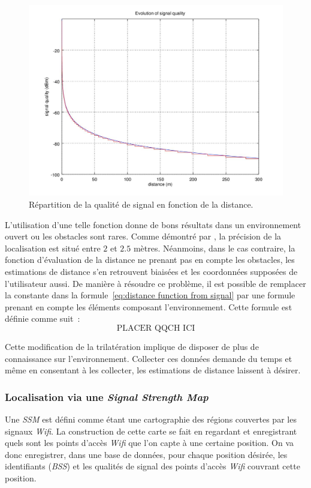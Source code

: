 \documentclass[11pt,journal,compsoc]{IEEEtran}
\begin{document}
      \begin{figure}
        \includegraphics[scale=0.4]{images/signal-propagation.jpg}
        \caption{Répartition de la qualité de signal en fonction de la distance.}
      \end{figure}

	  L'utilisation d'une telle fonction donne de bons résultats dans un environnement ouvert ou les obstacles sont rares. Comme démontré par \cite{Roumanie},
	  la précision de la localisation est situé entre $2$ et $2.5$ mètres. Néanmoins, dans le cas contraire, la fonction d'évaluation de la distance ne prenant
	  pas en compte les obstacles, les estimations de distance s'en retrouvent biaisées et les coordonnées supposées de l'utilisateur aussi. De manière à résoudre
	  ce problème, il est possible de remplacer la constante dans la formule~\eqref{eq:distance function from signal} par une formule prenant en compte les éléments
	  composant l'environnement. Cette formule est définie comme suit~:
      \begin{equation}
        \text{PLACER QQCH ICI}
      \end{equation}

	  Cette modification de la trilatération implique de disposer de plus de connaissance sur l'environnement. Collecter ces données demande du temps et même en
	  consentant à les collecter, les estimations de distance laissent à désirer.

    \subsubsection{Localisation via une \textit{Signal Strength Map}}
      Une \textit{SSM} est défini comme étant une cartographie des régions couvertes par les signaux \textit{Wifi}. La construction de cette carte se fait en regardant
	  et enregistrant quels sont les points d'accès \textit{Wifi} que l'on capte à une certaine position. On va donc enregistrer, dans une base de données, pour chaque
	  position désirée, les identifiants (\textit{BSS}) et les qualités de signal des points d'accès \textit{Wifi} couvrant cette position.
\end{document}
